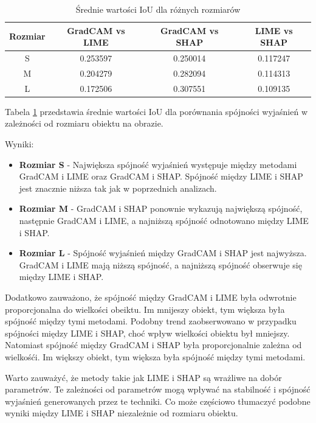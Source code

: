 \begin{table}[h]
	\centering
	\begin{tabular}{|c|c|c|c|}
		\hline
		\textbf{Rozmiar} & \textbf{GradCAM vs LIME} & \textbf{GradCAM vs SHAP} & \textbf{LIME vs SHAP} \\
		\hline
		S                & 0.253597                 & 0.250014                 & 0.117247              \\
		\hline
		M                & 0.204279                 & 0.282094                 & 0.114313              \\
		\hline
		L                & 0.172506                 & 0.307551                 & 0.109135              \\
		\hline
	\end{tabular}
	\caption{Średnie wartości IoU dla różnych rozmiarów}
	\label{tab:base_coherence_size}
\end{table}

Tabela \ref{tab:base_coherence_size} przedstawia średnie wartości IoU dla porównania spójności wyjaśnień w zależności od rozmiaru obiektu na obrazie.

Wyniki:
\begin{itemize}
	\item \textbf{Rozmiar S} - Największa spójność wyjaśnień występuje między metodami GradCAM i LIME oraz GradCAM i SHAP.
	      Spójność między LIME i SHAP jest znacznie niższa tak jak w poprzednich analizach.
	\item \textbf{Rozmiar M} - GradCAM i SHAP ponownie wykazują największą spójność, następnie GradCAM i LIME, a najniższą spójność odnotowano między LIME i SHAP.
	\item \textbf{Rozmiar L} - Spójność wyjaśnień między GradCAM i SHAP jest najwyższa. GradCAM i LIME mają niższą spójność, a najniższą spójność obserwuje się między LIME i SHAP.
\end{itemize}

Dodatkowo zauważono, że spójność między GradCAM i LIME była odwrotnie proporcjonalna do wielkości obeiktu.
Im mnijeszy obiekt, tym większa była spójność między tymi metodami.
Podobny trend zaobserwowano w przypadku spójności między LIME i SHAP, choć wpływ wielkości obiektu był mniejszy.
Natomiast spójność między GradCAM i SHAP była proporcjonalnie zależna od wielkośći.
Im większy obiekt, tym większa była spójność między tymi metodami.

Warto zauważyć, że metody takie jak LIME i SHAP są wrażliwe na dobór parametrów.
Te zależności od parametrów mogą wpływać na stabilność i spójność wyjaśnień generowanych przez te techniki.
Co może częściowo tłumaczyć podobne wyniki między LIME i SHAP niezależnie od rozmiaru obiektu.

